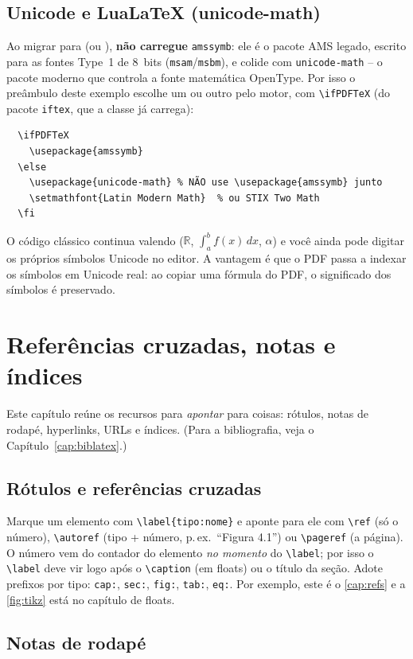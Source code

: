 \documentclass[dsc,pdfa]{coppe}
\begin{document}
  \section{Unicode e LuaLaTeX (unicode-math)}
  \label{sec:unicode-math}
  Ao migrar para  (ou ), \textbf{não carregue} \texttt{amssymb}: ele é o pacote AMS legado, escrito para as fontes Type~1 de 8~bits (\texttt{msam}/\texttt{msbm}), e colide com \texttt{unicode-math} -- o pacote moderno que controla a fonte matemática OpenType. Por isso o preâmbulo deste exemplo escolhe um ou outro pelo motor, com \verb|\ifPDFTeX| (do pacote \texttt{iftex}, que a classe já carrega):
  \begin{verbatim}
  \ifPDFTeX
    \usepackage{amssymb}
  \else
    \usepackage{unicode-math} % NÃO use \usepackage{amssymb} junto
    \setmathfont{Latin Modern Math}  % ou STIX Two Math
  \fi
  \end{verbatim}
  O código clássico continua valendo ($\mathbb{R}$, $\int_a^b f(x)\,dx$, $\alpha$) e você ainda pode digitar os próprios símbolos Unicode no editor. A vantagem é que o PDF passa a indexar os símbolos em Unicode real: ao copiar uma fórmula do PDF, o significado dos símbolos é preservado.

  \chapter{Referências cruzadas, notas e índices}
  \label{cap:refs}

  Este capítulo reúne os recursos para \emph{apontar} para coisas: rótulos, notas de rodapé, hyperlinks, URLs e índices. (Para a bibliografia, veja o Capítulo~\ref{cap:biblatex}.)

  \section{Rótulos e referências cruzadas}

  Marque um elemento com \verb|\label{tipo:nome}| e aponte para ele com \verb|\ref| (só o número), \verb|\autoref| (tipo + número, p.\,ex.\ ``Figura 4.1'') ou \verb|\pageref| (a página). O número vem do contador do elemento \emph{no momento} do \verb|\label|; por isso o \verb|\label| deve vir logo após o \verb|\caption| (em floats) ou o título da seção. Adote prefixos por tipo: \verb|cap:|, \verb|sec:|, \verb|fig:|, \verb|tab:|, \verb|eq:|. Por exemplo, este é o \autoref{cap:refs} e a \autoref{fig:tikz} está no capítulo de floats.

  \section{Notas de rodapé}
\end{document}

